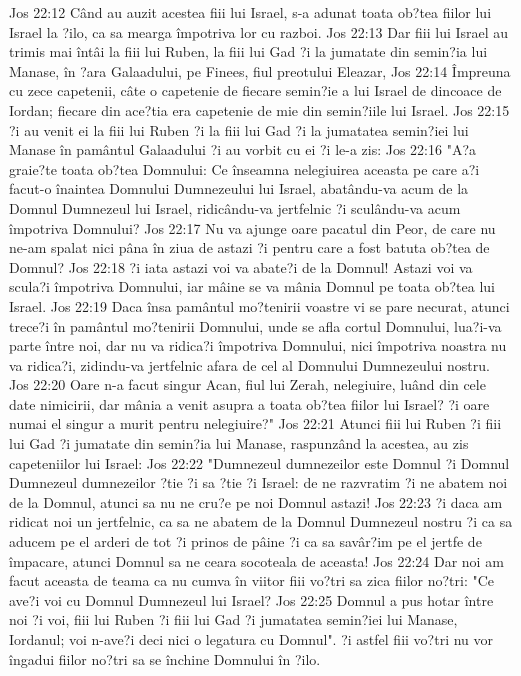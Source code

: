 Jos 22:12  Când au auzit acestea fiii lui Israel, s-a adunat toata ob?tea fiilor lui Israel la ?ilo, ca sa mearga împotriva lor cu razboi.
Jos 22:13  Dar fiii lui Israel au trimis mai întâi la fiii lui Ruben, la fiii lui Gad ?i la jumatate din semin?ia lui Manase, în ?ara Galaadului, pe Finees, fiul preotului Eleazar,
Jos 22:14  Împreuna cu zece capetenii, câte o capetenie de fiecare semin?ie a lui Israel de dincoace de Iordan; fiecare din ace?tia era capetenie de mie din semin?iile lui Israel.
Jos 22:15  ?i au venit ei la fiii lui Ruben ?i la fiii lui Gad ?i la jumatatea semin?iei lui Manase în pamântul Galaadului ?i au vorbit cu ei ?i le-a zis:
Jos 22:16  "A?a graie?te toata ob?tea Domnului: Ce înseamna nelegiuirea aceasta pe care a?i facut-o înaintea Domnului Dumnezeului lui Israel, abatându-va acum de la Domnul Dumnezeul lui Israel, ridicându-va jertfelnic ?i sculându-va acum împotriva Domnului?
Jos 22:17  Nu va ajunge oare pacatul din Peor, de care nu ne-am spalat nici pâna în ziua de astazi ?i pentru care a fost batuta ob?tea de Domnul?
Jos 22:18  ?i iata astazi voi va abate?i de la Domnul! Astazi voi va scula?i împotriva Domnului, iar mâine se va mânia Domnul pe toata ob?tea lui Israel.
Jos 22:19  Daca însa pamântul mo?tenirii voastre vi se pare necurat, atunci trece?i în pamântul mo?tenirii Domnului, unde se afla cortul Domnului, lua?i-va parte între noi, dar nu va ridica?i împotriva Domnului, nici împotriva noastra nu va ridica?i, zidindu-va jertfelnic afara de cel al Domnului Dumnezeului nostru.
Jos 22:20  Oare n-a facut singur Acan, fiul lui Zerah, nelegiuire, luând din cele date nimicirii, dar mânia a venit asupra a toata ob?tea fiilor lui Israel? ?i oare numai el singur a murit pentru nelegiuire?"
Jos 22:21  Atunci fiii lui Ruben ?i fiii lui Gad ?i jumatate din semin?ia lui Manase, raspunzând la acestea, au zis capeteniilor lui Israel:
Jos 22:22  "Dumnezeul dumnezeilor este Domnul ?i Domnul Dumnezeul dumnezeilor ?tie ?i sa ?tie ?i Israel: de ne razvratim ?i ne abatem noi de la Domnul, atunci sa nu ne cru?e pe noi Domnul astazi!
Jos 22:23  ?i daca am ridicat noi un jertfelnic, ca sa ne abatem de la Domnul Dumnezeul nostru ?i ca sa aducem pe el arderi de tot ?i prinos de pâine ?i ca sa savâr?im pe el jertfe de împacare, atunci Domnul sa ne ceara socoteala de aceasta!
Jos 22:24  Dar noi am facut aceasta de teama ca nu cumva în viitor fiii vo?tri sa zica fiilor no?tri: "Ce ave?i voi cu Domnul Dumnezeul lui Israel?
Jos 22:25  Domnul a pus hotar între noi ?i voi, fiii lui Ruben ?i fiii lui Gad ?i jumatatea semin?iei lui Manase, Iordanul; voi n-ave?i deci nici o legatura cu Domnul". ?i astfel fiii vo?tri nu vor îngadui fiilor no?tri sa se închine Domnului în ?ilo.
